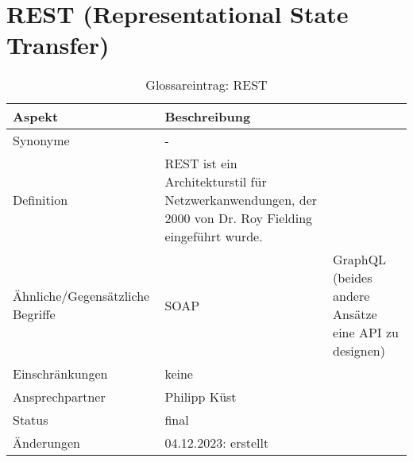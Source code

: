 \section{REST (Representational State Transfer)}\label{sec:glossar_rest}
\begin{table}[H]\label{tab:glossar_rest}
    \begin{tabularx}{\textwidth}{|l|X|}
        \hline
        \textbf{Aspekt} & \textbf{Beschreibung} \\
        \hline
        Synonyme & - \\
        \hline
        Definition & REST ist ein Architekturstil für Netzwerkanwendungen, der 2000 von Dr. Roy Fielding eingeführt wurde. \\
        \hline
        Ähnliche/Gegensätzliche Begriffe & SOAP & GraphQL (beides andere Ansätze eine API zu designen) \\
        \hline
        Einschränkungen & keine \\
        \hline
        Ansprechpartner & Philipp Küst \\
        \hline
        Status & final \\
        \hline
        Änderungen & 04.12.2023: erstellt \\
        \hline
    \end{tabularx}
    \caption{Glossareintrag: REST}
\end{table}